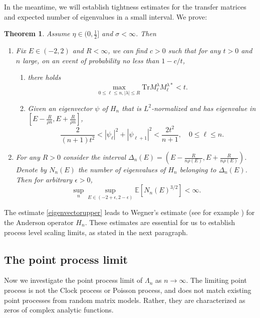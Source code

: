 \documentclass[12pt, reqno]{amsart}
\newtheorem{theorem}{Theorem}[section]
\theoremstyle{definition}
\theoremstyle{remark}
\numberwithin{equation}{section}
\begin{document}
In the meantime, we will establish tightness estimates for the transfer matrices and expected number of eigenvalues in a small interval. We prove:


\begin{theorem}\label{theorem3.1good}
Assume $\eta\in(0,\frac{1}{2}]$ and $\sigma<\infty$. Then 
    \begin{enumerate}
        \item  Fix $E\in(-2,2)$ and $R<\infty$, we can find $c>0$ such that for any $t>0$ and $n$ large, on an event of probability no less than $1-c/t$, 
        \begin{enumerate}
            \item there holds
      \begin{equation}
            \max_{0\leq\ell\leq n,|\lambda|\leq R}\text{Tr}M_\ell^\lambda M_\ell^{\lambda*}<t.
        \end{equation}
        \item Given an eigenvector $\psi$ of $H_n$ that is $L^2$-normalized and has eigenvalue in $[E-\frac{R}{\rho n},E+\frac{R}{\rho n}]$, 
            \begin{equation}\label{eigenpairups}
                \frac{2}{(n+1)t^2}<|\psi_\ell|^2+|\psi_{\ell+1}|^2<\frac{2t^2}{n+1},\quad 0\leq\ell\leq n.
            \end{equation}
        \end{enumerate}
        \item  For any $R>0$ consider the interval $\Delta_n(E)=(E-\frac{R}{n\rho(E)},E+\frac{R}{n\rho(E)})$. Denote by $N_n(E)$ the number of eigenvalues of $H_n$ belonging to $\Delta_n(E)$. Then for arbitrary $\epsilon>0$,
        \begin{equation}\label{eigenvectorupper}
        \sup_n\sup_{E\in(-2+\epsilon,2-\epsilon)}\mathbb{E}[N_n(E)^{3/2}]<\infty.\end{equation}
    \end{enumerate}
\end{theorem}
The estimate \ref{eigenvectorupper} leads to Wegner's estimate (see for example \cite{kirsch2007invitation}) for the Anderson operator $H_n$. These estimates are essential for us to establish process level scaling limits, as stated in the next paragraph.


\subsection{The point process limit}
Now we investigate the point process limit of $\Lambda_n$ as $n\to\infty$. The limiting point process is not the Clock process or Poisson process, and does not match existing point processes from random matrix models. Rather, they are characterized as zeros of complex analytic functions.
\end{document}
